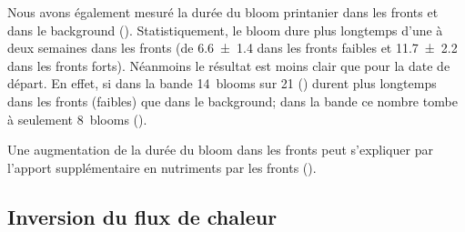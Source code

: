 Nous avons également mesuré la durée du bloom printanier dans les fronts et dans le background ().
Statistiquement, le bloom dure plus longtemps d'une à deux semaines dans les fronts (de \qty{6.6 \pm 1.4}{\jours} dans les fronts faibles et \qty{11.7 \pm 2.2}{\jours} dans les fronts forts).
Néanmoins le résultat est moins clair que pour la date de départ.
En effet, si dans la bande  14~blooms sur 21 () durent plus longtemps dans les fronts (faibles) que dans le background; dans la bande  ce nombre tombe à seulement 8~blooms ().

\begin{figure}
  \centering
  \label{fig:duree-bloom}
\end{figure}

Une augmentation de la durée du bloom dans les fronts peut s'expliquer par l'apport supplémentaire en nutriments par les fronts (\cite{simoes-sousa_2022}).

\subsection{Inversion du flux de chaleur}
\label{sec:flux-chaleur}
